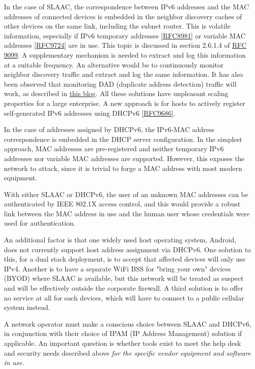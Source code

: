 \documentclass[
]{article}
\begin{document}
In the case of SLAAC, the correspondence between IPv6 addresses and the
MAC addresses of connected devices is embedded in the neighbor discovery
caches of other devices on the same link, including the subnet router.
This is volatile information, especially if IPv6 temporary addresses
{[}\href{https://www.rfc-editor.org/info/rfc8981}{RFC8981}{]} or
variable MAC addresses
{[}\href{https://www.rfc-editor.org/info/rfc9724}{RFC9724}{]} are in
use. This topic is discussed in section 2.6.1.4 of
\href{https://www.rfc-editor.org/info/rfc9099}{RFC 9099}. A
supplementary mechanism is needed to extract and log this information at
a suitable frequency. An alternative would be to continuously monitor
neighbor discovery traffic and extract and log the same information. It
has also been observed that monitoring DAD (duplicate address detection)
traffic will work, as described in
\href{https://weberblog.net/monitoring-mac-ipv6-address-bindings/}{this
blog}. All these solutions have unpleasant scaling properties for a
large enterprise. A new approach is for hosts to actively register
self-generated IPv6 addresses using DHCPv6
{[}\href{https://www.rfc-editor.org/info/rfc9686}{RFC9686}{]}.

In the case of addresses assigned by DHCPv6, the IPv6-MAC address
correspondence is embedded in the DHCP server configuration. In the
simplest approach, MAC addresses are pre-registered and neither
temporary IPv6 addresses nor variable MAC addresses are supported.
However, this exposes the network to attack, since it is trivial to
forge a MAC address with most modern equipment.

With either SLAAC or DHCPv6, the user of an unknown MAC addresses can be
authenticated by IEEE 802.1X access control, and this would provide a
robust link between the MAC address in use and the human user whose
credentials were used for authentication.

An additional factor is that one widely used host operating system,
Android, does not currently support host address assignment via DHCPv6.
One solution to this, for a dual stack deployment, is to accept that
affected devices will only use IPv4. Another is to have a separate WiFi
BSS for "bring your own" devices (BYOD) where SLAAC is available, but
this network will be treated as suspect and will be effectively outside
the corporate firewall. A third solution is to offer no service at all
for such devices, which will have to connect to a public cellular system
instead.

A network operator must make a conscious choice between SLAAC and
DHCPv6, in conjunction with their choice of IPAM (IP Address Management)
solution if applicable. An important question is whether tools exist to
meet the help desk and security needs described above \emph{for the
specific vendor equipment and software in use}.
\end{document}
